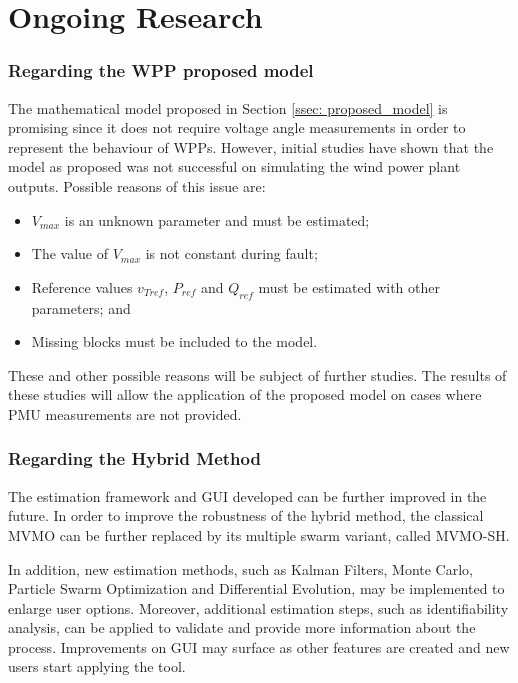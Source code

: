 \chapter{Ongoing Research}
\label{ch: Ongoing}

\subsection{Regarding the WPP proposed model}

The mathematical model proposed in Section \ref{ssec: proposed_model} is promising since it does not require voltage angle measurements in order to represent the behaviour of WPPs. However, initial studies have shown that the model as proposed was not successful on simulating the wind power plant outputs. Possible reasons of this issue are:

\begin{itemize}
	\item $V_{max}$ is an unknown parameter and must be estimated;
	\item The value of $V_{max}$ is not constant during fault;
	\item Reference values $v_{Tref}$, $P_{ref}$ and $Q_{ref}$ must be estimated with other parameters; and
	\item Missing blocks must be included to the model.
\end{itemize}

These and other possible reasons will be subject of further studies. The results of these studies will allow the application of the proposed model on cases where PMU measurements are not provided.

\subsection{Regarding the Hybrid Method}

The estimation framework and GUI developed can be further improved in the future. In order to improve the robustness of the hybrid method, the classical MVMO can be further replaced by its multiple swarm variant, called MVMO-SH.

In addition, new estimation methods, such as Kalman Filters, Monte Carlo, Particle Swarm Optimization and Differential Evolution, may be implemented to enlarge user options. Moreover, additional estimation steps, such as identifiability analysis, can be applied to validate and provide more information about the process. Improvements on GUI may surface as other features are created and new users start applying the tool.